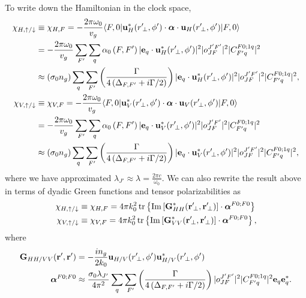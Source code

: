 \documentclass[preprint,aps,pra,onecolumn]{revtex4-1} %
\renewcommand{\tensor}[1]{\boldsymbol{#1}}
\begin{document}
To write down the Hamiltonian in the clock space,
\begin{align}
\chi_{H,\uparrow/\downarrow} & \equiv \chi_{H,F} =- \frac{2\pi \omega_0}{v_g} \bra{F,0} 
	\mathbf{u}^*_H(r^\prime\!_\perp, \phi') \cdot \tensor{\alpha} \cdot 
	\mathbf{u}_{H}(r^\prime\!_\perp, 
	\phi') \ket{F,0} \\
	& =- \frac{2\pi \omega_0}{v_g} \sum_{F'} \sum_q \alpha_0\left( F,F'  \right) |\mathbf{e}_q \cdot 
	\mathbf{u}_H^*(r^\prime\!_\perp,\phi')|^2 |o^{J'F'}_{JF} |^2 
	|C^{F 0;1q}_{F' q}|^2\\
	& \approx  \left( \sigma_0 n_g  \right)  \sum_q \sum_{F'} \left( 
		\frac{\Gamma}{4 
		\left(\Delta_{F,F'}+i\Gamma/2\right) }  \right) |\mathbf{e}_q \cdot 
		\mathbf{u}_H^*(r^\prime\!_\perp,\phi')|^2 |o^{J'F'}_{JF} |^2 
		|C^{F 0;1q}_{F' q}|^2,\label{eq:chiHeu}\\
\chi_{V,\uparrow/\downarrow} & \equiv \chi_{V,F} =- \frac{2\pi \omega_0}{v_g} \bra{F,0} 
	\mathbf{u}^*_V(r^\prime\!_\perp, \phi') \cdot \tensor{\alpha} \cdot 
	\mathbf{u}_{V}(r^\prime\!_\perp, 
	\phi') \ket{F,0} \\
	& =- \frac{2\pi \omega_0}{v_g} \sum_{F'} \sum_q \alpha_0\left( F,F'  \right) |\mathbf{e}_q \cdot 
	\mathbf{u}_V^*(r^\prime\!_\perp,\phi')|^2 |o^{J'F'}_{JF} |^2 
	|C^{F 0;1q}_{F' q}|^2\\
	& \approx   \left( \sigma_0 n_g  \right)  \sum_q\sum_{F'} \left( 
		\frac{\Gamma}{4 
		\left(\Delta_{F,F'}+i\Gamma/2\right) }  \right) |\mathbf{e}_q \cdot 
		\mathbf{u}_V^*(r^\prime\!_\perp,\phi')|^2 |o^{J'F'}_{JF} |^2 
		|C^{F 0;1q}_{F' q}|^2,\label{eq:chiVeu}\\
\end{align}
where we have approximated $ \lambda_{J'}\approx \lambda = \frac{2\pi c}{\omega_0} $.  We can also 
rewrite the result above in terms of dyadic Green functions and tensor polarizabilities as
\begin{align}
\chi_{H,\uparrow/\downarrow} & \equiv \chi_{H,F} = 4\pi k_0^2 \operatorname{tr} \left\{ \mathrm{Im}\left[ 
\mathbf{G}^*_{HH}(\mathbf{r}^\prime\!_\perp,\mathbf{r}^\prime\!_\perp) \right] \cdot \boldsymbol{\alpha}^{F0;F0} 
\right\}\label{eq:chiHGalpha}\\
\chi_{V,\uparrow/\downarrow} & \equiv \chi_{V,F} = 4\pi k_0^2 \operatorname{tr} \left\{ \mathrm{Im}\left[ 
\mathbf{G}^*_{VV}(\mathbf{r}^\prime\!_\perp,\mathbf{r}^\prime\!_\perp) \right] \cdot \boldsymbol{\alpha}^{F0;F0} 
\right\},\label{eq:chiGalpha}
\end{align}
where 
\begin{align} 
\mathbf{G}_{HH/VV}(\mathbf{r}',\mathbf{r}') &= -\frac{in_g}{2k_0} 
\mathbf{u}_{H/V}(r^\prime\!_\perp,\phi')\mathbf{u}_{H/V}^*(r^\prime\!_\perp,\phi')\\
\boldsymbol{\alpha}^{F0;F0} &\approx \frac{\sigma_0\lambda_{J'}}{4\pi^2}  \sum_q \sum_{F'} \left( 
		\frac{\Gamma}{4 
		\left(\Delta_{F,F'}+i\Gamma/2\right) }  \right)   |o^{J'F'}_{JF} |^2 
		|C^{F 0;1q}_{F' q}|^2  \mathbf{e}_q \mathbf{e}_q^*.
\end{align}
\end{document}
